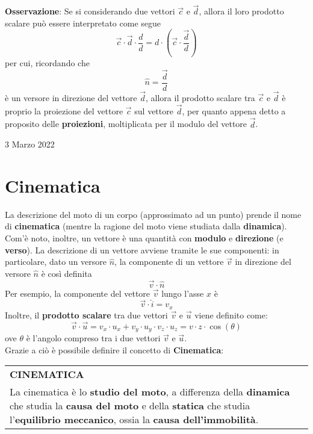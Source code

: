 \documentclass[a4paper]{extarticle}
\renewcommand\arraystretch{}
\begin{document}
\vspace{1em}
\noindent
\textbf{Osservazione}: Se si considerando due vettori $\vec{c}$ e $\vec{d}$, allora il loro prodotto scalare può essere interpretato come segue
\[\vec{c} \cdot \vec{d} \cdot \frac{d}{d} = d \cdot \left(\vec{c} \cdot \frac{\vec{d}}{d}\right)\]
per cui, ricordando che
\[\hat{n} = \frac{\vec{d}}{d}\]
è un versore in direzione del vettore $\vec{d}$, allora il prodotto scalare tra $\vec{c}$ e $\vec{d}$ è proprio la proiezione del vettore $\vec{c}$ sul vettore $\vec{d}$, per quanto appena detto a proposito delle \textbf{proiezioni}, moltiplicata per il modulo del vettore $\vec{d}$.

\newpage
\noindent
\begin{center}
  3 Marzo 2022
\end{center}

\section{Cinematica}
La descrizione del moto di un corpo (approssimato ad un punto) prende il nome di \textbf{cinematica} (mentre la ragione del moto viene studiata dalla \textbf{dinamica}). Com'è noto, inoltre, un vettore è una quantità con \textbf{modulo} e \textbf{direzione} (e \textbf{verso}). La descrizione di un vettore avviene tramite le sue componenti: in particolare, dato un versore $\hat{n}$, la componente di un vettore $\vec{v}$ in direzione del versore $\hat{n}$ è così definita
\[\vec{v} \cdot \hat{n}\]
Per esempio, la componente del vettore $\vec{v}$ lungo l'asse $x$ è
\[\vec{v} \cdot \hat{i} = v_x\]
Inoltre, il \textbf{prodotto scalare} tra due vettori $\vec{v}$ e $\vec{u}$ viene definito come:
\[\vec{v} \cdot \vec{u} = v_x \cdot u_x + v_y \cdot u_y \cdot v_z \cdot u_z = v \cdot z \cdot \cos(\theta)\]
ove $\theta$ è l'angolo compreso tra i due vettori $\vec{v}$ e $\vec{u}$.\\
Grazie a ciò è possibile definire il concetto di \textbf{Cinematica}:

\vspace{1em}
\setlength{\tabcolsep}{14pt}
\renewcommand{\arraystretch}{2}
\noindent
\begin{tabularx}{\textwidth}{@{}|P|@{}}
    \hline
    {\textbf{CINEMATICA}}\\
    \parbox{\linewidth}{La cinematica è lo \textbf{studio del moto}, a differenza della \textbf{dinamica} che studia la \textbf{causa del moto} e della \textbf{statica} che studia l'\textbf{equilibrio meccanico}, ossia la \textbf{causa dell'immobilità}.
    \vspace{3mm}}\\
    \hline
\end{tabularx}
\end{document}
